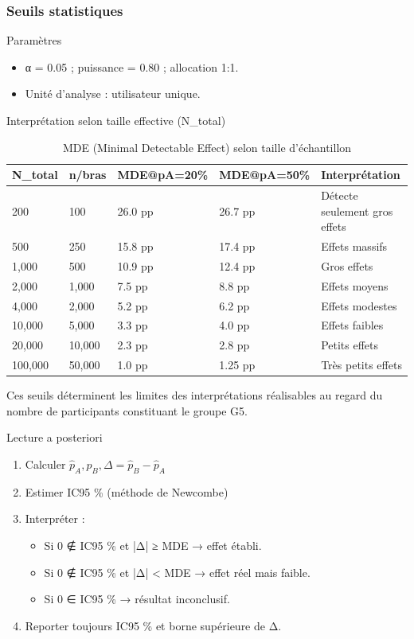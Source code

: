 \documentclass[a4paper,12pt]{article}
\begin{document}
\subsubsection{Seuils statistiques}
\label{sec:orgddad478}
Paramètres
\begin{itemize}
\item α = 0.05 ; puissance = 0.80 ; allocation 1:1.
\item Unité d’analyse : utilisateur unique.
\end{itemize}

Interprétation selon taille effective (N\_total)
\begin{table}[htbp]
\caption{MDE (Minimal Detectable Effect) selon taille d’échantillon}
\centering
\begin{tabular}{lllll}
N\_total & n/bras & MDE@pA=20\% & MDE@pA=50\% & Interprétation\\
\hline
200 & 100 & 26.0 pp & 26.7 pp & Détecte seulement gros effets\\
500 & 250 & 15.8 pp & 17.4 pp & Effets massifs\\
1,000 & 500 & 10.9 pp & 12.4 pp & Gros effets\\
2,000 & 1,000 & 7.5 pp & 8.8 pp & Effets moyens\\
4,000 & 2,000 & 5.2 pp & 6.2 pp & Effets modestes\\
10,000 & 5,000 & 3.3 pp & 4.0 pp & Effets faibles\\
20,000 & 10,000 & 2.3 pp & 2.8 pp & Petits effets\\
100,000 & 50,000 & 1.0 pp & 1.25 pp & Très petits effets\\
\end{tabular}
\end{table}

Ces seuils déterminent les limites des interprétations réalisables au regard du nombre de participants constituant le groupe G5.

Lecture a posteriori
\begin{enumerate}
\item Calculer \(\hat{p}_A, \hat{p}_B, \Delta = \hat{p}_B - \hat{p}_A\)
\item Estimer IC95 \% (méthode de Newcombe)
\item Interpréter :
\begin{itemize}
\item Si 0 ∉ IC95 \% et |Δ| ≥ MDE → effet établi.
\item Si 0 ∉ IC95 \% et |Δ| < MDE → effet réel mais faible.
\item Si 0 ∈ IC95 \% → résultat inconclusif.
\end{itemize}
\item Reporter toujours IC95 \% et borne supérieure de Δ.
\end{enumerate}
\end{document}
